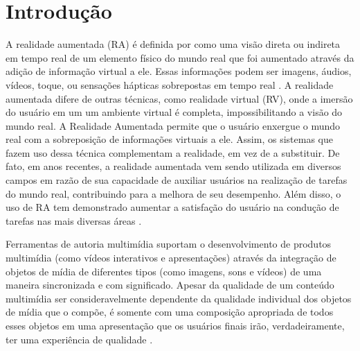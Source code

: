 \documentclass[../main.tex]{subfiles}
\begin{document}
\chapter{Introdução}\label{cap:introducao}

A realidade aumentada (RA) é definida por  como uma visão direta ou indireta em tempo real de um elemento físico do mundo real que foi aumentado através da adição de informação virtual a ele. Essas informações podem ser imagens, áudios, vídeos, toque, ou sensações hápticas sobrepostas em tempo real \cite{buchmann2004fingartips}. A realidade aumentada difere de outras técnicas, como realidade virtual (RV), onde a imersão do usuário em um um ambiente virtual é completa, impossibilitando a visão do mundo real. A Realidade Aumentada permite que o usuário enxergue o mundo real com a sobreposição de informações virtuais a ele. Assim, os sistemas que fazem uso dessa técnica complementam a realidade, em vez de a substituir. De fato, em anos recentes, a realidade aumentada vem sendo utilizada em diversos campos em razão de sua capacidade de auxiliar usuários na realização de tarefas do mundo real, contribuindo para a melhora de seu desempenho. Além disso, o uso de RA tem demonstrado aumentar a satisfação do usuário na condução de tarefas nas mais diversas áreas \cite{balog2010role, haugstvedt2012mobile, wojciechowski2013evaluation}.


Ferramentas de autoria multimídia suportam o desenvolvimento de produtos multimídia (como vídeos interativos e apresentações) através da integração de objetos de mídia de diferentes tipos (como imagens, sons e vídeos) de uma maneira sincronizada e com significado. Apesar da qualidade de um conteúdo multimídia ser consideravelmente dependente da qualidade individual dos objetos de mídia que o compõe, é somente com uma composição apropriada de todos esses objetos em uma apresentação que os usuários finais irão, verdadeiramente, ter uma experiência de qualidade \cite{pellan2009authoring}. 
\end{document}
